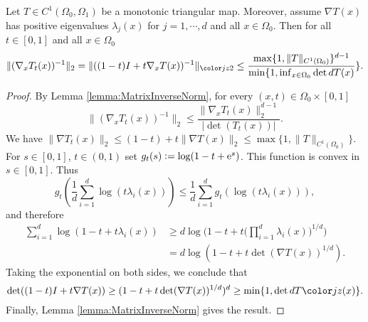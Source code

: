 \begin{lemma}\label{lemma:NormTtinverse}
  Let $T\in C^1(\Omega_0,\Omega_1)$ be a monotonic triangular map. Moreover, assume $\nabla T(x)$ has positive eigenvalues
  $\lambda_j(x)$ for $j = 1,\cdots, d$ and all $x\in\Omega_0$.
  Then for all $t\in [0,1]$ and all $x\in\Omega_0$
  \begin{equation*}
    \|(\nabla_x T_t(x))^{-1}\|_{2} = \|((1-t)I + t\nabla_x
    T(x))^{-1}\|_{\jz{2}} \le
    \frac{
      \max\{1,\|T\|_{C^1(\Omega_0)}\}^{d-1}
    }{\min\{1, \inf_{x\in\Omega_0}\det dT(x)}\}.
  \end{equation*}
\end{lemma}
\begin{proof}
  By Lemma \ref{lemma:MatrixInverseNorm}, for every
  $(x,t)\in\Omega_0\times [0,1]$
  \begin{equation*}
    \|(\nabla_x T_t(x))^{-1}\|_2\leq \frac{\|\nabla_xT_t(x)\|_{2}^{d-1}}{|\det(T_t(x))|}.
  \end{equation*}
  We have
  $\|\nabla T_t(x)\|_{2} \leq (1-t) + t\|\nabla
  T(x)\|_{2} \le \max\{1,\|T\|_{C^1(\Omega_0)}\}$. For
  $s\in [0,1]$, $t\in (0,1)$ set $g_t(s) := \log(1-t+\mathrm{e}^{s})$. This
  function is convex in $s\in[0,1]$. Thus
  \begin{equation*}
    g_t\left(\frac{1}{d} \sum_{i=1}^d\log (t\lambda_i(x))\right)\le
    \frac{1}{d} \sum_{i=1}^d g_t(\log (t\lambda_i(x))),
  \end{equation*}
  and therefore
  \begin{align*}
    \sum_{i=1}^d \log(1-t+t\lambda_i(x)) &\ge d \log\Bigg(1-t +
                                           t\Bigg(\prod_{i=1}^d \lambda_i(x)\Bigg)^{1/d}\Bigg)\nonumber\\
                                         &= d\log(1-t+t\det(\nabla
                                           T(x))^{1/d}).
  \end{align*}
  Taking the exponential on both sides, we conclude that
  \begin{equation*}
    \det((1-t)I + t\nabla T(x)) \geq (1-t+t\det(\nabla T(x))^{1/d})^d \geq \min\{1, \det dT\jz{(x)}\}.
  \end{equation*}
  Finally, Lemma \ref{lemma:MatrixInverseNorm} gives the result.
\end{proof}

